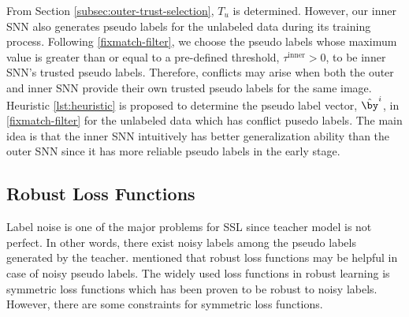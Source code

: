 \documentclass{article}
\begin{document}
From Section \ref{subsec:outer-trust-selection}, $T_u$ is determined.
However, our inner SNN also generates pseudo labels for the unlabeled data during its training process.
Following \eqref{fixmatch-filter}, we choose the pseudo labels whose maximum value is greater than or equal to
a pre-defined threshold, $\tau^{\text{inner}} > 0$, to be inner SNN's trusted pseudo labels.
Therefore, conflicts may arise when both the outer and inner SNN provide their own trusted pseudo labels for the same image.
Heuristic \ref{lst:heuristic} is proposed to determine the pseudo label vector, $\hat{\by}^i$, in \eqref{fixmatch-filter} for the unlabeled data which has conflict pusedo labels.
The main idea is that
the inner SNN intuitively has better generalization ability than the outer SNN since it has more reliable pseudo labels in the early stage.
\begin{heuristic}[t]
\caption{Merging Conflict Pseudo Labels}
\label{lst:heuristic}
\end{heuristic}

\subsection{Robust Loss Functions}
\label{subsec:robust-loss}

Label noise is one of the major problems for SSL since teacher model is not perfect.
In other words, there exist noisy labels among the pseudo labels generated by the teacher.
\cite{WC22a} mentioned that robust loss functions may be helpful in case of noisy pseudo labels.
The widely used loss functions in robust learning is symmetric loss functions \cite{NM13a,AG17a} which has been proven to be robust to noisy labels.
However, there are some constraints for symmetric loss functions.
\end{document}
